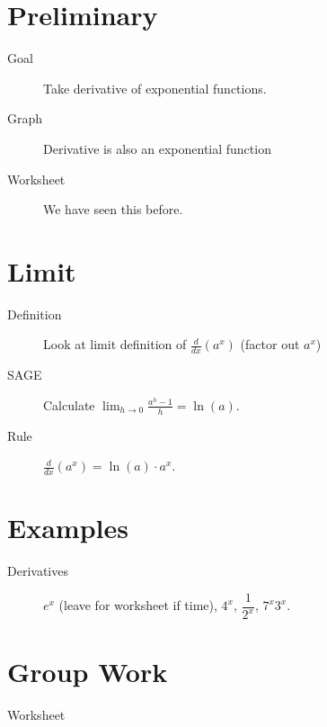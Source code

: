 \documentclass[11pt]{article}
\begin{document}
\drawtitle

\section*{Preliminary}
\begin{description}
\item[Goal] Take derivative of exponential functions.
\item[Graph] Derivative is also an exponential function
\item[Worksheet] We have seen this before.
\end{description}

\section*{Limit}
\begin{description}
\item[Definition] Look at limit definition of $\displaystyle
  \frac{d}{dx}\left(a^x\right)$ (factor out $a^x$)
\item[SAGE] Calculate $\displaystyle \lim_{h\to
    0}\frac{a^h-1}{h}=\ln(a)$.
\item[Rule] $\displaystyle \frac{d}{dx}\left(a^x\right) = \ln(a)\cdot a^x$.
\end{description}

\section*{Examples}
\begin{description}
\item [Derivatives] $e^x$ (leave for worksheet if time), $4^x$,
  $\dfrac{1}{2^x}$, $7^x3^x$.
\end{description}

\section*{Group Work}
\begin{description}
\item[Worksheet]
\end{description}
\end{document}

